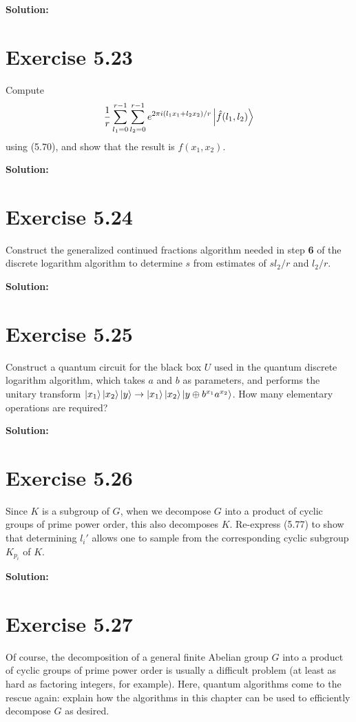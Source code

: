 \documentclass{book}
\begin{document}
    \textbf{Solution:}
    
\section*{Exercise 5.23}
    Compute
    \begin{align}
        \frac{1}{r}\sum_{l_1=0}^{r-1}\sum_{l_2=0}^{r-1} e^{2\pi i (l_1x_1+l_2x_2)/r}\ket{\hat{f}(l_1,l_2)}
    \end{align}
    using (5.70), and show that the result is $f(x_1,x_2)$.
    
    \textbf{Solution:}
    
\section*{Exercise 5.24}
    Construct the generalized continued fractions algorithm needed in step \textbf{6} of the discrete logarithm algorithm to determine $s$ from estimates of $s l_2/r$ and $l_2/r$.
    
    \textbf{Solution:}
    
\section*{Exercise 5.25}
    Construct a quantum circuit for the black box $U$ used in the quantum discrete logarithm algorithm, which takes $a$ and $b$ as parameters, and performs the unitary transform $\ket{x_1}\ket{x_2}\ket{y}\rightarrow\ket{x_1}\ket{x_2}\ket{y\oplus b^{x_1}a^{x_2}}$. How many elementary operations are required?
    
    \textbf{Solution:}
    
\section*{Exercise 5.26}
    Since $K$ is a subgroup of $G$, when we decompose $G$ into a product of cyclic groups of prime power order, this also decomposes $K$. Re-express (5.77) to show that determining $l_i'$ allows one to sample from the corresponding cyclic subgroup $K_{p_i}$ of $K$.
    
    \textbf{Solution:}
    
\section*{Exercise 5.27}
    Of course, the decomposition of a general finite Abelian group $G$ into a product of cyclic groups of prime power order is usually a difficult problem (at least as hard as factoring integers, for example). Here, quantum algorithms come to the rescue again: explain how the algorithms in this chapter can be used to efficiently decompose $G$ as desired.
    
\end{document}
